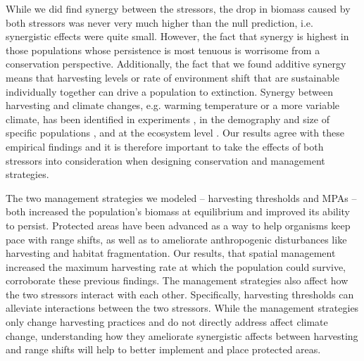 \documentclass[12pt,english]{article}
\begin{document}
\begin{spacing}{1.9}
\begin{flushleft}
While we did find synergy between the stressors, the drop in biomass caused by both stressors was never very much higher than the null prediction, i.e. synergistic effects were quite small.  However, the fact that synergy is highest in those populations whose persistence is most tenuous is worrisome from a conservation perspective.  Additionally, the fact that we found additive synergy means that harvesting levels or rate of environment shift that are sustainable individually together can drive a population to extinction.  Synergy between harvesting and climate changes, e.g. warming temperature or a more variable climate, has been identified in experiments \citep{Moraetal2007}, in the demography and size of specific populations \citep{Planque:2010uq}, and at the ecosystem level \citep{Kirby:2009fk}.  Our results  agree with these empirical findings and it is therefore important to take the effects of both stressors into consideration when designing conservation and management strategies.

The two management strategies we modeled -- harvesting thresholds and MPAs -- both increased the population's biomass at equilibrium and improved its ability to persist.  Protected areas have been advanced as a way to help organisms keep pace with range shifts, as well as to ameliorate anthropogenic disturbances like harvesting and habitat fragmentation\citep{Lawleretal2010, Hannahetal2007,Botsfordetal2001, Gaylordetal2005, HastingsBotsford2003,Thomasetal2012}.  Our results, that spatial management increased the maximum harvesting rate at which the population could survive, corroborate these previous findings.  The management strategies also affect how the two stressors interact with each other.  Specifically, harvesting thresholds can alleviate interactions between the two stressors.   While the management strategies only change harvesting practices and do not directly address affect climate change, understanding how they ameliorate synergistic affects between harvesting and range shifts will help to better implement and place protected areas.


\end{flushleft}
\end{spacing}
\end{document}
